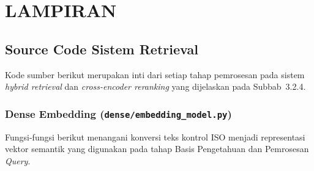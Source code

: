 \chapter*{LAMPIRAN}

\section{Source Code Sistem Retrieval}

Kode sumber berikut merupakan inti dari setiap tahap pemrosesan pada sistem \textit{hybrid retrieval} dan \textit{cross-encoder reranking} yang dijelaskan pada Subbab~3.2.4.

\subsection{Dense Embedding (\texttt{dense/embedding\_model.py})}

Fungsi-fungsi berikut menangani konversi teks kontrol ISO menjadi representasi vektor semantik yang digunakan pada tahap Basis Pengetahuan dan Pemrosesan \textit{Query}.

